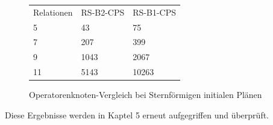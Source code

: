 \begin{figure}[ht]
\centering

\begin{tabular}{|l|l|l|}
Relationen & RS-B2-CPS & RS-B1-CPS \\
5          & 43        & 75        \\
7          & 207       & 399       \\
9          & 1043      & 2067      \\
11         & 5143      & 10263 \\         
\end{tabular}
\caption{Operatorenknoten-Vergleich bei Sternförmigen initialen Plänen}
\label{pyroIncomplete}
\end{figure}



Diese Ergebnisse werden in Kaptel 5 erneut aufgegriffen und überprüft.



